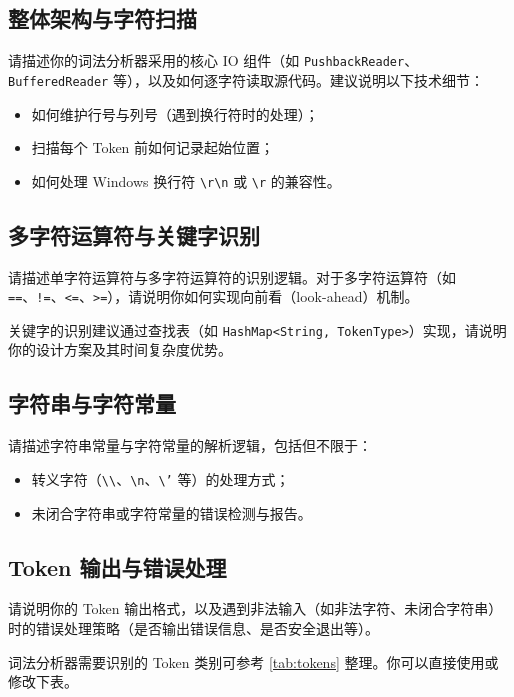 \documentclass[12pt,hyperref,a4paper,UTF8]{ctexart}
\begin{document}
\subsection{整体架构与字符扫描}

请描述你的词法分析器采用的核心 IO 组件（如 \texttt{PushbackReader}、\texttt{BufferedReader} 等），以及如何逐字符读取源代码。建议说明以下技术细节：
\begin{itemize}
    \item 如何维护行号与列号（遇到换行符时的处理）；
    \item 扫描每个 Token 前如何记录起始位置；
    \item 如何处理 Windows 换行符 \texttt{\textbackslash r\textbackslash n} 或 \texttt{\textbackslash r} 的兼容性。
\end{itemize}

\subsection{多字符运算符与关键字识别}

请描述单字符运算符与多字符运算符的识别逻辑。对于多字符运算符（如 \texttt{==}、\texttt{!=}、\texttt{<=}、\texttt{>=}），请说明你如何实现向前看（look-ahead）机制。

关键字的识别建议通过查找表（如 \texttt{HashMap<String, TokenType>}）实现，请说明你的设计方案及其时间复杂度优势。

\subsection{字符串与字符常量}

请描述字符串常量与字符常量的解析逻辑，包括但不限于：
\begin{itemize}
    \item 转义字符（\texttt{\textbackslash\textbackslash}、\texttt{\textbackslash n}、\texttt{\textbackslash '} 等）的处理方式；
    \item 未闭合字符串或字符常量的错误检测与报告。
\end{itemize}

\subsection{Token 输出与错误处理}

请说明你的 Token 输出格式，以及遇到非法输入（如非法字符、未闭合字符串）时的错误处理策略（是否输出错误信息、是否安全退出等）。

词法分析器需要识别的 Token 类别可参考 \autoref{tab:tokens} 整理。你可以直接使用或修改下表。
\end{document}
